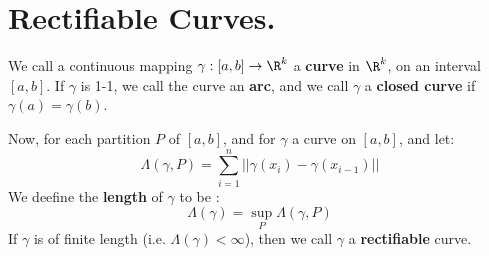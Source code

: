 
\section{Rectifiable Curves.}

\begin{definition}
    We call a continuous mapping $\gamma:[a,b] \rightarrow \R^k$ a
    \textbf{curve} in $\R^k$, on  an interval $[a,b]$. If  $\gamma$ is 1-1, we
    call the curve an \textbf{arc}, and we call  $\gamma$ a \textbf{closed
    curve} if  $\gamma(a)=\gamma(b)$.

    Now, for each partition $P$ of  $[a,b]$, and for  $\gamma$ a curve on
    $[a,b]$, and let:
        \begin{equation}
            \Lambda(\gamma,P)=\sum_{i=1}^{n}{||\gamma(x_i)-\gamma(x_{i-1})||}		
        \end{equation}
    We deefine the \textbf{length} of $\gamma$ to be :
        \begin{equation}
            \Lambda(\gamma)=\sup_{P}{\Lambda(\gamma,P)}		
        \end{equation} 
        If $\gamma$ is of finite length  (i.e. $\Lambda(\gamma)<\infty$), then
        we call $\gamma$ a \textbf{rectifiable} curve.
\end{definition}

